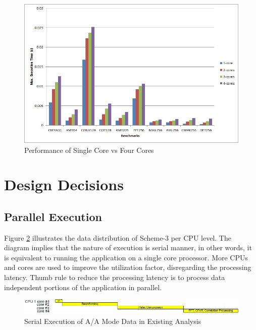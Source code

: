 \begin{figure}[h!]
	\centering
	\includegraphics[width=140mm]{figures/1core_4core}
	\caption{Performance of Single Core vs Four Cores}
	\label{fig:mm:1core_4core}
\end{figure}


\clearpage
\section{Design Decisions}
\label{mm:design_decisions}

\subsection{Parallel Execution}
Figure \ref{fig:mm:aa_serial_exe} illustrates the data distribution of Scheme-3 per CPU level. The diagram implies that the nature of execution is serial manner, in other words, it is equivalent to running the application on a single core processor. More CPUs and cores are used to improve the utilization factor, disregarding the processing latency. Thumb rule to reduce the processing latency is to process data independent portions of the application in parallel. 

\begin{figure}[h!]
	\centering
	\includegraphics[width=160mm]{figures/aa_serial_exe}
	\caption{Serial Execution of A/A Mode Data in Existing Analysis}
	\label{fig:mm:aa_serial_exe}
\end{figure}

